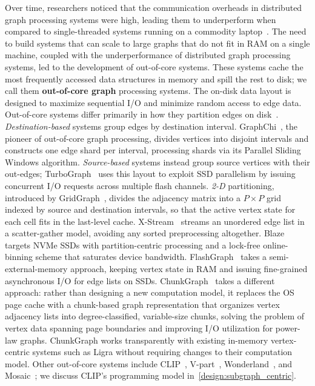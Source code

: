 Over time, researchers noticed that the communication overheads in distributed graph processing systems were high, leading them to underperform when compared to single-threaded systems running on a commodity laptop~\cite{mcsherry2015scalability}.
The need to build systems that can scale to large graphs that do not fit in RAM on a single machine, coupled with the underperformance of distributed graph processing systems, led to the development of out-of-core systems.
These systems cache the most frequently accessed data structures in memory and spill the rest to disk; we call them \textbf{out-of-core graph} processing systems.
The on-disk data layout is designed to maximize sequential I/O and minimize random access to edge data.
Out-of-core systems differ primarily in how they partition edges on disk~\cite{xu2026oocsurvey}.
\emph{Destination-based} systems group edges by destination interval. GraphChi~\cite{kyrola2012graphchi}, the pioneer of out-of-core graph processing, divides vertices into disjoint intervals and constructs one edge shard per interval, processing shards via its Parallel Sliding Windows algorithm.
\emph{Source-based} systems instead group source vertices with their out-edges; TurboGraph~\cite{han2013turbograph} uses this layout to exploit SSD parallelism by issuing concurrent I/O requests across multiple flash channels.
\emph{2-D} partitioning, introduced by GridGraph~\cite{zhu2015gridgraph}, divides the adjacency matrix into a $P \times P$ grid indexed by source and destination intervals, so that the active vertex state for each cell fits in the last-level cache.
X-Stream~\cite{roy2013x} streams an unordered edge list in a scatter-gather model, avoiding any sorted preprocessing altogether.
Blaze~\cite{kim2022blaze} targets NVMe SSDs with partition-centric processing and a lock-free online-binning scheme that saturates device bandwidth.
FlashGraph~\cite{zheng2015flashgraph} takes a semi-external-memory approach, keeping vertex state in RAM and issuing fine-grained asynchronous I/O for edge lists on SSDs.
ChunkGraph~\cite{wang2024chunkgraph} takes a different approach: rather than designing a new computation model, it replaces the OS page cache with a chunk-based graph representation that organizes vertex adjacency lists into degree-classified, variable-size chunks, solving the problem of vertex data spanning page boundaries and improving I/O utilization for power-law graphs.
ChunkGraph works transparently with existing in-memory vertex-centric systems such as Ligra without requiring changes to their computation model.
Other out-of-core systems include CLIP~\cite{ai2018clip}, V-part~\cite{elyasi2019large}, Wonderland~\cite{zhang2018wonderland}, and Mosaic~\cite{maass2017mosaic}; we discuss CLIP's programming model in~\autoref{design:subgraph_centric}.

